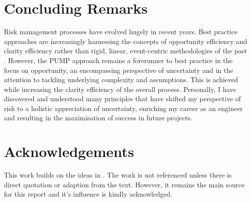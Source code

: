 \documentclass{ecsarticle}     %
\begin{document}

\mainmatter




\section{Concluding Remarks}
Risk management processes have evolved hugely in recent years.
Best practice approaches are increasingly harnessing the concepts of opportunity efficiency and clarity efficiency rather than rigid, linear, event-centric methodologies of the past \citep{association2012}.
However, the PUMP approach remains a forerunner to best practice in the focus on opportunity, an encompassing perspective of uncertainty and in the attention to tackling underlying complexity and assumptions.
This is achieved while increasing the clarity efficiency of the overall process.
Personally, I have discovered and understood many principles that have shifted my perspective of risk to a holistic appreciation of uncertainty, enriching my career as an engineer and resulting in the maximisation of success in future projects.
\backmatter




\appendix
\appendixpage
\appendixheaderon
%
\section{Acknowledgements}
This work builds on the ideas in \cite{chapman}. The work is not referenced unless there is direct quotation or adaption from the text. However, it remains the main source for this report and it's influence is kindly acknowledged.
\end{document}
